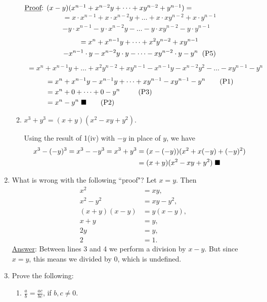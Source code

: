 \documentclass[12pt]{article}
\begin{document}
\begin{enumerate}
\begin{enumerate}
$\text{\underline{Proof}: }(x - y)(x^{n-1} + x^{n-2}y + \dots + xy^{n-2} + y^{n-1}) = $
\begin{multline*}
= x \cdot x^{n-1} + x \cdot x^{n-2}y + \dots + x \cdot xy^{n-2} + x \cdot y^{n-1} \\- y \cdot x^{n-1} - y \cdot x^{n-2}y - \dots - y \cdot xy^{n-2} - y \cdot y^{n-1}
\end{multline*}
\begin{multline*}
= x^n + x^{n-1}y + \dots + x^2y^{n-2} + xy^{n-1} \\- x^{n-1} \cdot y - x^{n-2}y \cdot y- \dots - xy^{n-2} \cdot y - y^n \hspace{.2cm} \text{(P5)}
\end{multline*}
\begin{multline*}
= x^n + x^{n-1}y + \dots + x^2y^{n-2} + xy^{n-1} - x^{n-1}y - x^{n-2}y^2- \dots - xy^{n-1} - y^n
\end{multline*}
\begin{align*}
&= x^n + x^{n-1}y - x^{n-1}y + \dots + xy^{n-1} - xy^{n-1} - y^n \tag{P1}\\
&= x^n + 0 + \dots + 0 - y^n \hspace{.2cm} \tag{P3}\\
&= x^n - y^n \hspace{.1cm} \blacksquare \tag{P2}\\
\end{align*}
							
\item $x^3 + y^3 = (x + y)(x^2 - xy + y^2)$.

Using the result of 1(iv) with $-y$ in place of $y$, we have
\begin{align*}
x^3 - (-y)^3 = x^3 - -y^3 = x^3 + y^3 &= (x - (-y))(x^2 + x(-y) + (-y)^2) \\
							&= (x + y)(x^2 - xy + y^2) \hspace{.1cm} \blacksquare
\end{align*}
\end{enumerate}
\item What is wrong with the following ``proof"? Let $x = y$. Then
\begin{align*}
x^2 &= xy,\\
x^2 - y^2 &= xy - y^2,\\
(x + y)(x - y) &= y(x - y),\\
x + y &= y,\\
2y &= y,\\
2 &= 1.
\end{align*}
\underline{Answer}: Between lines 3 and 4 we perform a division by $x - y$. But since $x = y$, this means we divided by 0, which is undefined.\\
\item Prove the following:
\begin{enumerate}
\item $\frac{a}{b}=\frac{ac}{bc}$, if $b,c \neq 0$.


\end{enumerate}
\end{enumerate}
\end{document}
